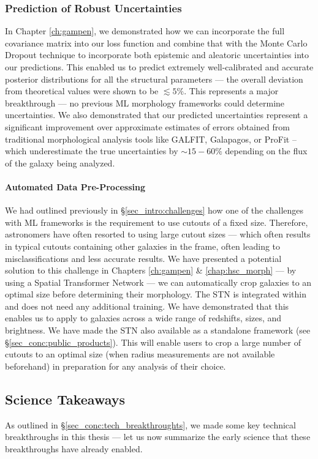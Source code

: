 \subsubsection{Prediction of Robust Uncertainties}
In Chapter \ref{ch:gampen}, we demonstrated how we can incorporate the full covariance matrix into our loss function and combine that with the Monte Carlo Dropout technique to incorporate both epistemic and aleatoric uncertainties into our predictions. This enabled us to predict extremely well-calibrated and accurate posterior distributions for all the structural parameters --- the overall deviation from theoretical values were shown to be $\lesssim 5\%$. This represents a major breakthrough --- no previous ML morphology frameworks could determine uncertainties. We also demonstrated that our predicted uncertainties represent a significant improvement over approximate estimates of errors obtained from traditional morphological analysis tools like GALFIT, Galapagos, or ProFit -- which underestimate the true uncertainties by $\sim15-60\%$ depending on the flux of the galaxy being analyzed. 


\paragraph{Automated Data Pre-Processing} We had outlined previously in \S \ref{sec_intro:challenges} how one of the challenges with ML frameworks is the requirement to use cutouts of a fixed size. Therefore, astronomers have often resorted to using large cutout sizes --- which often results in typical cutouts containing other galaxies in the frame, often leading to misclassifications and less accurate results. We have presented a potential solution to this challenge in Chapters \ref{ch:gampen} \& \ref{chap:hsc_morph} --- by using a Spatial Transformer Network --- we can automatically crop galaxies to an optimal size before determining their morphology. The STN is integrated within \gampen{} and does not need any additional training. We have demonstrated that this enables us to apply \gampen{} to galaxies across a wide range of redshifts, sizes, and brightness. We have made the STN also available as a standalone framework (see \S \ref{sec_conc:public_products}). This will enable users to crop a large number of cutouts to an optimal size (when radius measurements are not available beforehand) in preparation for any analysis of their choice.  

\subsection{Science Takeaways} \label{sec_conc:science_takeaways}
As outlined in \S \ref{sec_conc:tech_breakthroughts}, we made some key technical breakthroughs in this thesis --- let us now summarize the early science that these breakthroughs have already enabled. 

